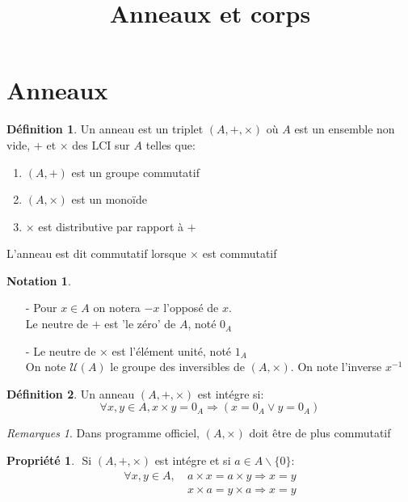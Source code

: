 \documentclass[fleqn]{article}
\title{Anneaux et corps}
\date{}
\theoremstyle{definition} \newtheorem*{defi}{D\'efinition}
\theoremstyle{definition} \newtheorem*{theo}{Th\'eor\`eme}
\theoremstyle{definition} \newtheorem*{coro}{Corollaire}
\theoremstyle{definition} \newtheorem*{nota}{Notation}
\theoremstyle{remark} \newtheorem*{rqs}{Remarques}
\theoremstyle{definition} \newtheorem*{prop}{Propri\'et\'e}
\begin{document}
\maketitle

\section{Anneaux}
\begin{defi}
	Un anneau est un triplet $(A, +, \times)$ o\`u $A$ est un ensemble non vide, $+$ et $\times$ des LCI sur $A$ telles que:
	\begin{enumerate}
		\item $(A, +)$ est un groupe commutatif
		\item $(A, \times)$ est un mono\"ide
		\item $\times$ est distributive par rapport \`a $+$
	\end{enumerate}
L'anneau est dit commutatif lorsque $\times$ est commutatif
\end{defi}

\begin{nota} $ $
	\begin{itemize}
		\item [-] Pour $x \in A$ on notera $-x$ l'oppos\'e de $x$.\\
			Le neutre de $+$ est 'le z\'ero' de $A$, not\'e $0_A$
		\item [-] Le neutre de $\times$ est l'\'el\'ement unit\'e, not\'e $1_A$\\
			On note $\mathcal{U}(A)$ le groupe des inversibles de $(A, \times)$. On note l'inverse $x^{-1}$
	\end{itemize}
\end{nota}

\begin{defi}
	Un anneau $(A, + , \times)$ est int\'egre si:
	\[\forall x,y \in A, x\times y = 0_A \Rightarrow (x = 0_A \lor y = 0_A)\]
	\begin{rqs} Dans programme officiel, $(A, \times)$ doit \^etre de plus commutatif \end{rqs}
\end{defi}

\begin{prop} $ $
	Si $(A,+,\times)$ est int\'egre et si $a \in A\backslash \{0\}$:
		\begin{align*}
			\forall x,y \in A,\ & a \times x = a \times y \Rightarrow x = y \\
								& x \times a = y \times a \Rightarrow x = y
		\end{align*}
\end{prop}
\end{document}
